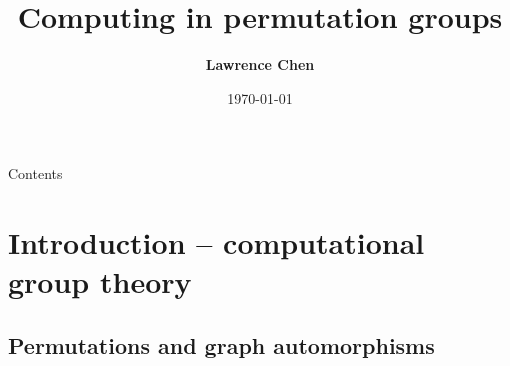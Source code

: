 \documentclass[handout]{beamer}
\title{\textbf{Computing in permutation groups}}
\author{\textbf{Lawrence Chen}}
\institute{\textbf{M40110 Honours presentation}}
\date{\today}
\begin{document}
\begin{frame}
    \titlepage
\end{frame}

\begin{frame}{Contents}
    \tableofcontents
\end{frame}

\section{Introduction -- computational group theory}



\subsection{Permutations and graph automorphisms}
\end{document}
